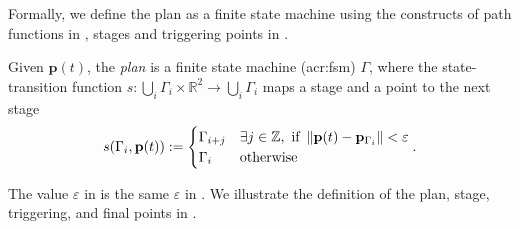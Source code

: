 Formally, we define the plan as a finite state machine using the constructs of path functions in , stages and triggering points in .

\begin{defn}[Plan]
  \label{def:plan}
  Given $\mathbf{p}(t)$, the \emph{plan} is a finite state machine (\Gls{acr:fsm}) $\Gamma$, where the state-transition function $s:\bigcup_i{\Gamma_i}\times\mathbb{R}^2\rightarrow\bigcup_i{\Gamma_i}$ maps a stage and a point to the next stage
  \begin{equation*}s(\Gamma_i,\mathbf{p}(t)):=\begin{cases}
    \Gamma_{i+j} & \exists j\in\mathbb{Z},\text{ if }\left\lVert\mathbf{p}(t)-\mathbf{p}_{\Gamma_i}\right\rVert<\varepsilon\\
    \Gamma_i & \text{otherwise}
  \end{cases}.\end{equation*}
\end{defn}

The value $\varepsilon$ in  is the same $\varepsilon$ in . We illustrate the definition of the plan, stage, triggering, and final points in .

